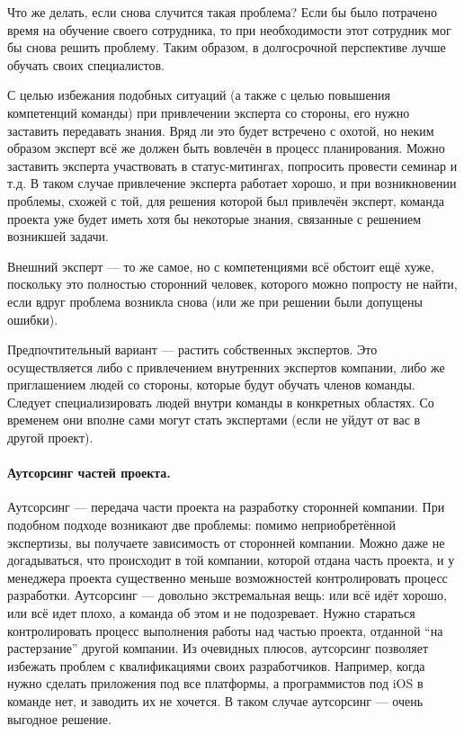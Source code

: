 \documentclass{../../text-style}
\begin{document}
Что же делать, если снова случится такая проблема? Если бы было потрачено время на обучение своего сотрудника, то при необходимости этот сотрудник мог бы снова решить проблему. Таким образом, в долгосрочной перспективе лучше обучать своих специалистов.

С целью избежания подобных ситуаций (а также с целью повышения компетенций команды) при привлечении эксперта со стороны, его нужно заставить передавать знания. Вряд ли это будет встречено с охотой, но неким образом эксперт всё же должен быть вовлечён в процесс планирования. Можно заставить эксперта участвовать в статус-митингах, попросить провести семинар и т.д. В таком случае привлечение эксперта работает хорошо, и при возникновении проблемы, схожей с той, для решения которой был привлечён эксперт, команда проекта уже будет иметь хотя бы некоторые знания, связанные с решением возникшей задачи.

Внешний эксперт --- то же самое, но с компетенциями всё обстоит ещё хуже, поскольку это полностью сторонний человек, которого можно попросту не найти, если вдруг проблема возникла снова (или же при решении были допущены ошибки).

Предпочтительный вариант --- растить собственных экспертов. Это осуществляется либо с привлечением внутренних экспертов компании, либо же приглашением людей со стороны, которые будут обучать членов команды. Следует специализировать людей внутри команды в конкретных областях. Со временем они вполне сами могут стать экспертами (если не уйдут от вас в другой проект).

\paragraph{Аутсорсинг частей проекта.} Аутсорсинг --- передача части проекта на разработку сторонней компании. При подобном подходе возникают две проблемы: помимо неприобретённой экспертизы, вы получаете зависимость от сторонней компании. Можно даже не догадываться, что происходит в той компании, которой отдана часть проекта, и у менеджера проекта существенно меньше возможностей контролировать процесс разработки. Аутсорсинг --- довольно экстремальная вещь: или всё идёт хорошо, или всё идет плохо, а команда об этом и не подозревает. Нужно стараться контролировать процесс выполнения работы над частью проекта, отданной \enquote{на растерзание} другой компании. Из очевидных плюсов, аутсорсинг позволяет избежать проблем с квалификациями своих разработчиков. Например, когда нужно сделать приложения под все платформы, а программистов под iOS в команде нет, и заводить их не хочется. В таком случае аутсорсинг --- очень выгодное решение.
\end{document}
